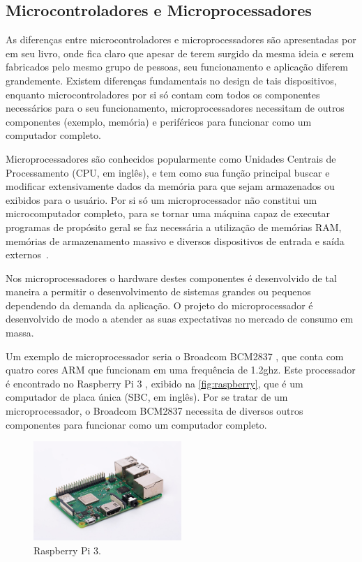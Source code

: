 \subsection{Microcontroladores e Microprocessadores}%

As diferenças entre microcontroladores e microprocessadores são apresentadas por  em seu livro, onde fica claro que apesar de terem surgido da mesma ideia e serem fabricados pelo mesmo grupo de pessoas, seu funcionamento e aplicação diferem grandemente. Existem diferenças fundamentais no design de tais dispositivos, enquanto microcontroladores por si só contam com todos os componentes necessários para o seu funcionamento, microprocessadores necessitam de outros componentes (exemplo, memória) e periféricos para funcionar como um computador completo.

Microprocessadores são conhecidos popularmente como Unidades Centrais de Processamento (CPU, em inglês), e tem como sua função principal buscar e modificar extensivamente dados da memória para que sejam armazenados ou exibidos para o usuário. Por si só um microprocessador não constitui um microcomputador completo, para se tornar uma máquina capaz de executar programas de propósito geral se faz necessária a utilização de memórias RAM, memórias de armazenamento massivo e diversos dispositivos de entrada e saída externos~\cite{ayala:1991}.

Nos microprocessadores o hardware destes componentes é desenvolvido de tal maneira a permitir o desenvolvimento de sistemas grandes ou pequenos dependendo da demanda da aplicação. O projeto do microprocessador é desenvolvido de modo a atender as suas expectativas no mercado de consumo em massa.  

Um exemplo de microprocessador seria o Broadcom BCM2837 \cite{raspberry_bcm}, que conta com quatro cores ARM que funcionam em uma frequência de 1.2ghz. Este processador é encontrado no Raspberry Pi 3 \cite{raspberry:pi3}, exibido na \autoref{fig:raspberry}, que é um computador de placa única (SBC, em inglês). Por se tratar de um microprocessador, o Broadcom BCM2837 necessita de diversos outros componentes para funcionar como um computador completo.

\begin{figure}[ht]
    \centering
    \includegraphics[width=0.5\textwidth, keepaspectratio]{resources/rasp.jpg}
    \caption{Raspberry Pi 3. \cite{raspberry:pi3}}
    \label{fig:raspberry}
\end{figure}

